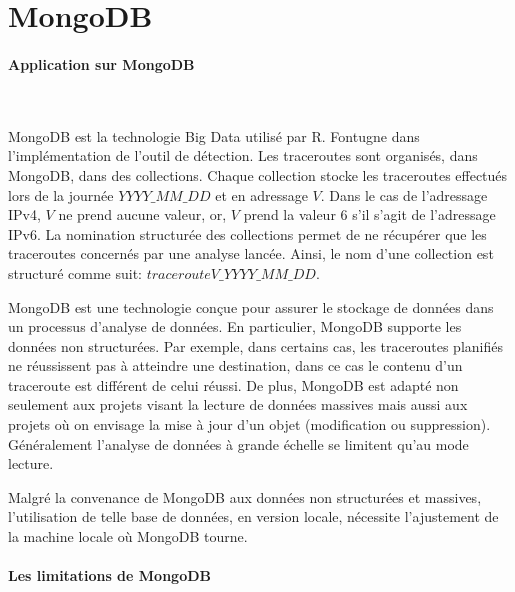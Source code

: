 \section{MongoDB}
\paragraph{ Application sur  MongoDB}~


MongoDB est la technologie Big Data utilisé par R. Fontugne dans l'implémentation de l'outil de détection. Les traceroutes sont organisés, dans MongoDB, dans des collections.  Chaque collection stocke les traceroutes effectués lors de la journée $YYYY\_MM\_DD$ et en adressage $V$. Dans le  cas de l'adressage IPv4, $V$  ne prend aucune valeur,  or, $V$ prend la valeur $6$ s'il s'agit de l'adressage IPv6.  La nomination structurée des collections permet de ne récupérer que les traceroutes concernés par une analyse lancée. Ainsi, le nom d'une collection est structuré comme suit: 	$tracerouteV\_YYYY\_MM\_DD$.
 

 
 MongoDB est une technologie conçue pour assurer  le stockage de données dans un processus d'analyse de données. En particulier, MongoDB supporte les données non structurées. Par exemple, dans certains cas, les traceroutes planifiés ne réussissent pas à atteindre une destination, dans ce cas le contenu d'un traceroute est différent de celui réussi. De plus, MongoDB est adapté non seulement aux projets visant la lecture de données massives mais aussi aux projets où on envisage la mise à jour d'un objet (modification ou suppression). Généralement l'analyse de données à grande échelle se limitent qu'au mode lecture.
 
 Malgré la convenance de MongoDB aux données non structurées et massives, l'utilisation de telle base de données, en version locale, nécessite l'ajustement de la machine locale où MongoDB tourne. 


\paragraph{Les limitations de MongoDB}


